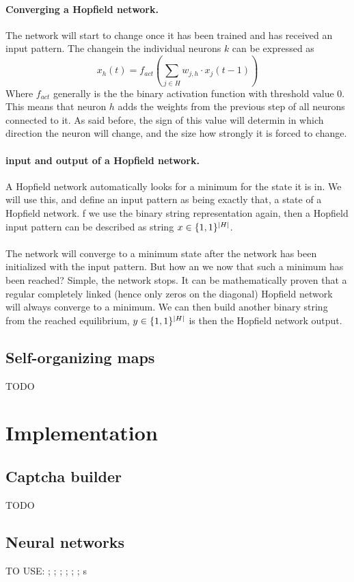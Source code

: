 \documentclass[pdftex,a4paper,12pt,twoside]{report}
\theoremstyle{plain} \newtheorem{theorem}{Theorem} \newtheorem{proposition}{Proposition} \newtheorem{lemma}{Lemma} \newtheorem*{corollary}{Corollary}
\theoremstyle{definition} \newtheorem{definition}{Definition} \newtheorem{conjecture}{Conjecture} \newtheorem*{example}{Example} \newtheorem{algorithm}{Algorithm}
\theoremstyle{remark} \newtheorem*{remark}{Remark} \newtheorem*{note}{Note} \newtheorem{case}{Case}
\begin{document}
\paragraph{Converging a Hopfield network.}
The network will start to change once it has been trained and has received an input pattern. The changein the individual neurons $k$ can be expressed as
\begin{equation}
x_h(t) = f_{act} (\sum_{j \in H} w_{j,h} \cdot x_j(t-1))
\end{equation} Where $f_{act}$ generally is the the binary activation function with threshold value 0.\\This means that neuron $h$ adds the weights from the previous step of all neurons connected to it. As said before, the sign of this value will determin in which direction the neuron will change, and the size how strongly it is forced to change. 
\paragraph{input and output of a Hopfield network.} A Hopfield network automatically looks for a minimum for the state it is in. We will use this, and define an input pattern as being exactly that, a state of a Hopfield network. f we use the binary string representation again, then a Hopfield input pattern can be described as string $x \in \{\-1,1\}^{|H|}$.\\\\The network will converge to a minimum state after the network has been initialized with the input pattern. But how an we now that such a minimum has been reached? Simple, the network stops. It can be mathematically proven that a regular completely linked (hence only zeros on the diagonal) Hopfield network will always converge to a minimum. We can then build another binary string from the reached equilibrium, $y \in \{\-1,1\}^{|H|}$ is then the Hopfield network output.
\subsection{Self-organizing maps}
TODO
\section{Implementation}
\label{sec:implementation}
\subsection{Captcha builder}
TODO
\subsection{Neural networks}
TO USE: \citep{Browning2007}; \citep{Chellapilla2005}; \citep{Fletcher2009}; \citep{Gang}; \citep{Jiang2003}; \citep{SathasivamSaratha2011}; \citep{Torma1995}s
\end{document}
